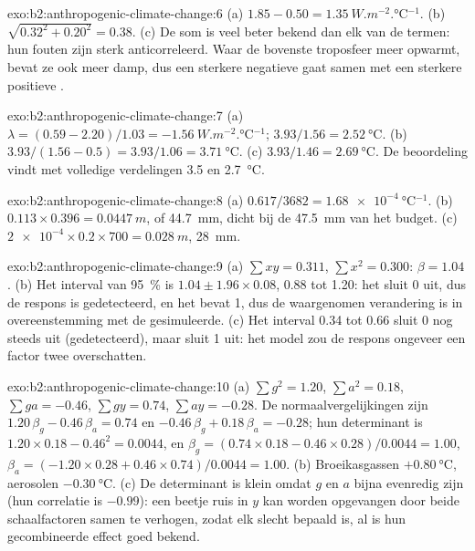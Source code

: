 \begin{solution}{exo:b2:anthropogenic-climate-change:6}
(a) $1.85 - 0.50 = \qty{1.35}{W.m^{-2}.\celsius^{-1}}$. (b) $\sqrt{0.32^2 + 0.20^2} = 0.38$.
(c) De som is veel beter bekend dan elk van de termen: hun fouten zijn sterk anticorreleerd. Waar
de bovenste troposfeer meer opwarmt, bevat ze ook meer damp, dus een sterkere negatieve  gaat samen met een sterkere positieve .
\end{solution}

\begin{solution}{exo:b2:anthropogenic-climate-change:7}
(a) $\lambda = (0.59 - 2.20)/1.03 = \qty{-1.56}{W.m^{-2}.\celsius^{-1}}$; $3.93/1.56 =
\qty{2.52}{\celsius}$. (b) $3.93/(1.56 - 0.5) = 3.93/1.06 = \qty{3.71}{\celsius}$. (c) $3.93/1.46 =
\qty{2.69}{\celsius}$. De beoordeling vindt met volledige verdelingen 3.5 en \qty{2.7}{\celsius}.
\end{solution}

\begin{solution}{exo:b2:anthropogenic-climate-change:8}
(a) $0.617/3682 = \qty{1.68e-4}{\celsius^{-1}}$. (b) $0.113 \times 0.396 = \qty{0.0447}{m}$, of
\qty{44.7}{mm}, dicht bij de \qty{47.5}{mm} van het budget. (c) $\num{2e-4} \times 0.2 \times 700 =
\qty{0.028}{m}$, \qty{28}{mm}.
\end{solution}

\begin{solution}{exo:b2:anthropogenic-climate-change:9}
(a) $\sum xy = 0.311$, $\sum x^2 = 0.300$: $\beta = 1.04$. (b) Het interval van \qty{95}{\percent} is
$1.04 \pm 1.96 \times 0.08$, 0.88 tot 1.20: het sluit 0 uit, dus de respons is gedetecteerd, en het bevat
1, dus de waargenomen verandering is in overeenstemming met de gesimuleerde. (c) Het interval 0.34 tot 0.66 sluit
0 nog steeds uit (gedetecteerd), maar sluit 1 uit: het model zou de respons ongeveer een factor
twee overschatten.
\end{solution}

\begin{solution}{exo:b2:anthropogenic-climate-change:10}
(a) $\sum g^2 = 1.20$, $\sum a^2 = 0.18$, $\sum ga = -0.46$, $\sum gy = 0.74$, $\sum ay = -0.28$.
De normaalvergelijkingen zijn $1.20\,\beta_g - 0.46\,\beta_a = 0.74$ en $-0.46\,\beta_g + 0.18\,\beta_a
= -0.28$; hun determinant is $1.20 \times 0.18 - 0.46^2 = 0.0044$, en $\beta_g = (0.74 \times
0.18 - 0.46 \times 0.28)/0.0044 = 1.00$, $\beta_a = (-1.20 \times 0.28 + 0.46 \times 0.74)/0.0044 =
1.00$. (b) Broeikasgassen $+\qty{0.80}{\celsius}$, aerosolen $-\qty{0.30}{\celsius}$. (c) De
determinant is klein omdat $g$ en $a$ bijna evenredig zijn (hun correlatie is $-0.99$): een
beetje ruis in $y$ kan worden opgevangen door beide schaalfactoren samen te verhogen, zodat elk slecht
bepaald is, al is hun gecombineerde effect goed bekend.
\end{solution}

